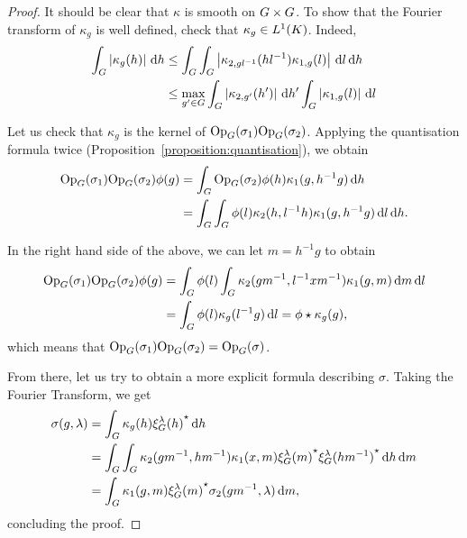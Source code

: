 \begin{proof}
    It should be clear that $\kappa$ is smooth on $G \times G$.
    To show that the Fourier transform of $\kappa_g$ is well defined,
    check that $\kappa_g \in {L^{1} (K)}$.
    Indeed,
    \begin{align*}
        \int_G \left|{\kappa_g(h)}\right| \,\mathrm{d} h
        &\leq \int_G \int_G \left|{\kappa_{2, g l^{-1}}(h l^{-1}) \kappa_{1, g}(l)}\right| \,\mathrm{d} l \,\mathrm{d} h\\
        &\leq \max_{g' \in G} \int_G \left|{\kappa_{2, g'}(h')}\right| \,\mathrm{d} h'
        \int_G \left|{\kappa_{1, g}(l)}\right| \,\mathrm{d} l
    \end{align*}

    Let us check that $\kappa_g$ is the kernel of $\mathrm{Op}_{G}(\sigma_1) \mathrm{Op}_{G}(\sigma_2)$.
    Applying the quantisation formula twice (Proposition~\ref{proposition:quantisation}),
    we obtain
    \begin{align*}
        \mathrm{Op}_{G}(\sigma_1) \mathrm{Op}_{G}(\sigma_2) \phi(g)
        &= \int_G \mathrm{Op}_{G}(\sigma_2) \phi(h) \kappa_1(g, h^{-1} g) \,\mathrm{d} h\\
        &= \int_G \int_G \phi(l) \kappa_2(h, l^{-1} h) \kappa_1(g, h^{-1} g) \,\mathrm{d} l \,\mathrm{d} h.
    \end{align*}

    In the right hand side of the above,
    we can let $m = h^{-1} g$ to obtain
    \begin{align*}
        \mathrm{Op}_{G}(\sigma_1) \mathrm{Op}_{G}(\sigma_2) \phi(g)
        &= \int_G \phi(l) \int_G \kappa_2(g m^{-1}, l^{-1} x m^{-1}) \kappa_1(g, m) \,\mathrm{d} m \,\mathrm{d} l\\
        &= \int_G \phi(l) \kappa_g(l^{-1} g) \,\mathrm{d} l
        = \phi \star \kappa_g(g),
    \end{align*}
    which means that $\mathrm{Op}_{G}(\sigma_1) \mathrm{Op}_{G}(\sigma_2) = \mathrm{Op}_{G}(\sigma)$.

    From there, let us try to obtain a more explicit formula describing $\sigma$.
    Taking the Fourier Transform,
    we get
    \begin{align*}
        \sigma(g, \lambda)
        &= \int_G \kappa_g(h) {\xi^{\lambda}_{G}(h)}^\star \,\mathrm{d} h\\
        &= \int_G \int_G \kappa_2(g m^{-1}, h m^{-1}) \kappa_1(x, m) {\xi^{\lambda}_{G}(m)}^\star {\xi^{\lambda}_{G}(h m^{-1})}^\star \,\mathrm{d} h \,\mathrm{d} m\\
        &= \int_G \kappa_1(g, m) {\xi^{\lambda}_{G}(m)}^\star \sigma_2(g m^{-1}, \lambda) \,\mathrm{d} m,
    \end{align*}
    concluding the proof.
\end{proof}

